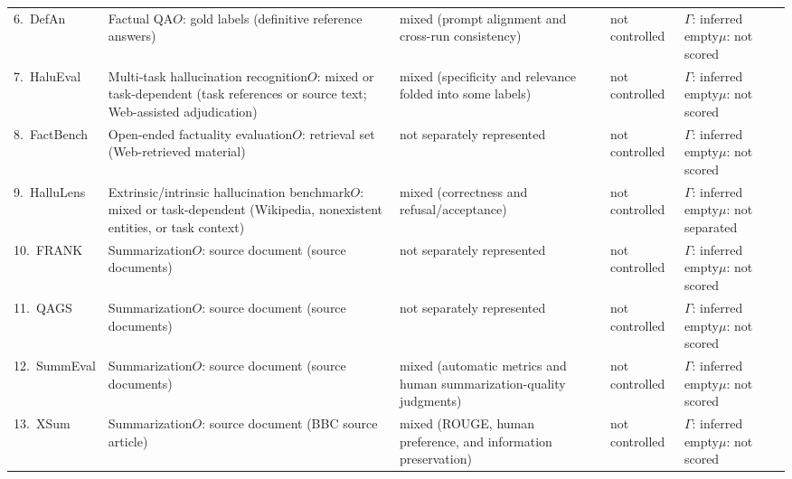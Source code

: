 \documentclass{clv2025}
\begin{document}
\begin{table}[t]
\begin{tabularx}{0.99\linewidth}{
  @{}P{0.17\textwidth}P{0.25\textwidth}
  P{0.15\textwidth}P{0.14\textwidth}Y@{}}
6.~DefAn \citep{rahman_defan_2024} & Factual QA\newline $O$: gold labels (definitive reference answers) & mixed (prompt alignment and cross-run consistency) & not controlled & $\Gamma$: inferred empty\newline $\mu$: not scored\\
7.~HaluEval \citep{li_halueval_2023} & Multi-task hallucination recognition\newline $O$: mixed or task-dependent (task references or source text; Web-assisted adjudication) & mixed (specificity and relevance folded into some labels) & not controlled & $\Gamma$: inferred empty\newline $\mu$: not scored\\
8.~FactBench \citep{bayat_factbench_2024} & Open-ended factuality evaluation\newline $O$: retrieval set (Web-retrieved material) & not separately represented & not controlled & $\Gamma$: inferred empty\newline $\mu$: not scored\\
9.~HalluLens \citep{bang_hallulens_2025} & Extrinsic/intrinsic hallucination benchmark\newline $O$: mixed or task-dependent (Wikipedia, nonexistent entities, or task context) & mixed (correctness and refusal/acceptance) & not controlled & $\Gamma$: inferred empty\newline $\mu$: not separated\\
10.~FRANK \citep{pagnoni_understanding_2021} & Summarization\newline $O$: source document (source documents) & not separately represented & not controlled & $\Gamma$: inferred empty\newline $\mu$: not scored\\
11.~QAGS \citep{wang_asking_2020} & Summarization\newline $O$: source document (source documents) & not separately represented & not controlled & $\Gamma$: inferred empty\newline $\mu$: not scored\\
12.~SummEval \citep{fabbri_summeval_2021} & Summarization\newline $O$: source document (source documents) & mixed (automatic metrics and human summarization-quality judgments) & not controlled & $\Gamma$: inferred empty\newline $\mu$: not scored\\
13.~XSum \citep{narayan_xsum_2018} & Summarization\newline $O$: source document (BBC source article) & mixed (ROUGE, human preference, and information preservation) & not controlled & $\Gamma$: inferred empty\newline $\mu$: not scored\\
\bottomrule
\end{tabularx}
\end{table}
\end{document}
